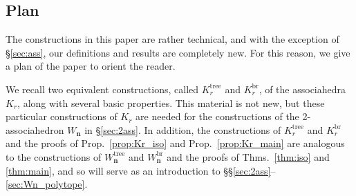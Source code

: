 \documentclass[11pt]{amsart}
\theoremstyle{definition}
\theoremstyle{remark}
\theoremstyle{plain}
\newcommand\bn{\mathbf{n}}
\newcommand{\on}{\operatorname}
\newcommand{\tree}{{\on{tree}}}
\newcommand{\br}{{\on{br}}}
\begin{document}
\subsection{Plan}

The constructions in this paper are rather technical, and with the exception of \S\ref{sec:ass}, our definitions and results are completely new.
For this reason, we give a plan of the paper to orient the reader.

\medskip

\noindent {\bf\S\ref{sec:ass}:}
We recall two equivalent constructions,
called $K_r^\tree$ and $K_r^\br$,
of the associahedra $K_r$, along with several basic properties.
This material is not new, but these particular constructions of $K_r$ are needed for the constructions of the 2-associahedron $W_\bn$ in \S\ref{sec:2ass}.
In addition, the constructions of $K_r^\tree$ and $K_r^\br$ and the proofs of Prop.~\ref{prop:Kr_iso} and Prop.~\ref{prop:Kr_main} are analogous to the constructions of $W_\bn^\tree$ and $W_\bn^\br$ and the proofs of Thms.~\ref{thm:iso} and \ref{thm:main}, and so will serve as an introduction to \S\S\ref{sec:2ass}--\ref{sec:Wn_polytope}.
\end{document}
